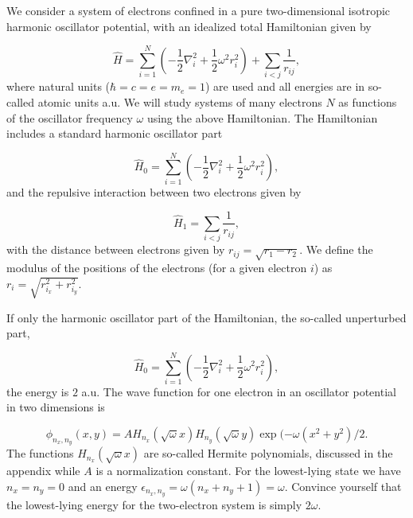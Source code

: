 \documentclass[%
oneside,                 %
final,                   %
10pt]{article}
\begin{document}
We consider a system of electrons confined in a pure two-dimensional 
isotropic harmonic oscillator potential, with an idealized  total Hamiltonian given by

\begin{equation}
\label{eq:finalH}
\hat{H}=\sum_{i=1}^{N} \left(  -\frac{1}{2} \nabla_i^2 + \frac{1}{2} \omega^2r_i^2  \right)+\sum_{i<j}\frac{1}{r_{ij}},
\end{equation}
where natural units ($\hbar=c=e=m_e=1$) are used and all energies are in so-called atomic units a.u. We will study systems of many electrons $N$ as functions of the oscillator frequency  $\omega$ using the above Hamiltonian.  The Hamiltonian includes a standard harmonic oscillator part

\begin{equation*}
\hat{H}_0=\sum_{i=1}^{N} \left(  -\frac{1}{2} \nabla_i^2 + \frac{1}{2} \omega^2r_i^2  \right),
\end{equation*}
and the repulsive interaction between two electrons given by

\begin{equation*}
\hat{H}_1=\sum_{i < j}\frac{1}{r_{ij}},
\end{equation*}
with the distance between electrons given by $r_{ij}=\sqrt{r_1-r_2}$. We define the 
modulus of the positions of the electrons (for a given electron $i$) as $r_i = \sqrt{r_{i_x}^2+r_{i_y}^2}$.



If only the harmonic oscillator part of the Hamiltonian,
the so-called unperturbed part,

\begin{equation*} \hat{H}_0=\sum_{i=1}^{N} \left(  -\frac{1}{2} \nabla_i^2 + \frac{1}{2} \omega^2r_i^2  \right),\end{equation*}
the energy is $2$ a.u.
The wave function for one electron in an oscillator potential in two dimensions is

\begin{equation*}
\phi_{n_x,n_y}(x,y) = A H_{n_x}(\sqrt{\omega}x)H_{n_y}(\sqrt{\omega}y)\exp{(-\omega(x^2+y^2)/2}.
\end{equation*}
The functions $H_{n_x}(\sqrt{\omega}x)$ are so-called Hermite polynomials, discussed in the appendix while $A$ is a normalization constant. 
For the lowest-lying state we have $n_x=n_y=0$ and an energy $\epsilon_{n_x,n_y}=\omega(n_x+n_y+1) = \omega$.
Convince yourself that the lowest-lying energy for the two-electron system  is simply $2\omega$.
\end{document}
